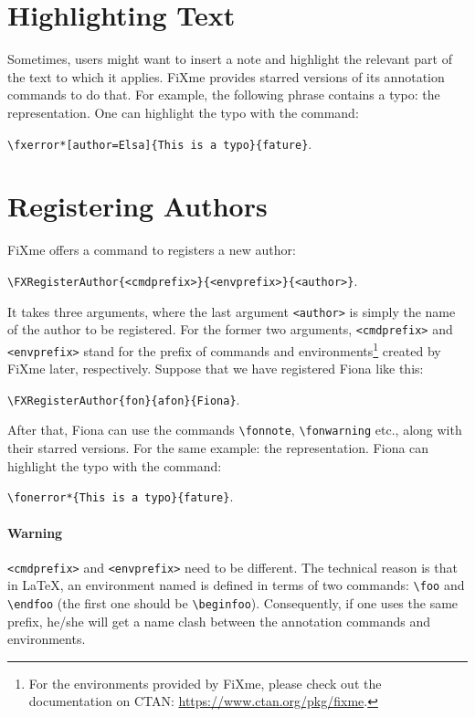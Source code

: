 \section{Highlighting Text}
\label{content:annotations:higlight}

Sometimes, users might want to insert a note and highlight the relevant part of the text to which it applies. FiXme provides starred versions of its annotation commands to do that. For example, the following phrase contains a typo: the  representation. One can highlight the typo with the command:

\begin{center}
    \verb|\fxerror*[author=Elsa]{This is a typo}{fature}|.
\end{center}

\section{Registering Authors}

FiXme offers a command to registers a new author:

\begin{center}
    \verb|\FXRegisterAuthor{<cmdprefix>}{<envprefix>}{<author>}|.
\end{center}

It takes three arguments, where the last argument \verb|<author>| is simply the name of the author to be registered. For the former two arguments, \verb|<cmdprefix>| and \verb|<envprefix>| stand for the prefix of commands and environments\footnote{For the environments provided by FiXme, please check out the documentation on CTAN: \url{https://www.ctan.org/pkg/fixme}.} created by FiXme later, respectively. Suppose that we have registered Fiona like this:

\begin{center}
    \verb|\FXRegisterAuthor{fon}{afon}{Fiona}|.
\end{center}

After that, Fiona can use the commands \verb|\fonnote|, \verb|\fonwarning| etc., along with their starred versions. For the same example: the  representation. Fiona can highlight the typo with the command:

\begin{center}
    \verb|\fonerror*{This is a typo}{fature}|.
\end{center}

\paragraph{Warning~}\verb|<cmdprefix>| and \verb|<envprefix>| need to be different. The technical reason is that in \LaTeX{}, an environment named  is defined in terms of two commands: \verb|\foo| and \verb|\endfoo| (the first one should be \verb|\beginfoo|). Consequently, if one uses the same prefix, he/she will get a name clash between the annotation commands and environments.
